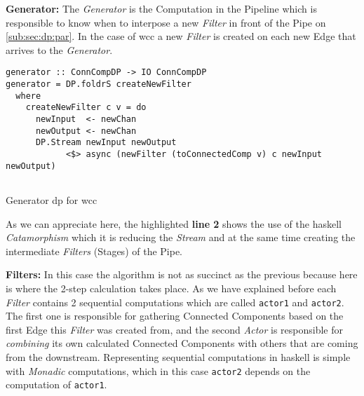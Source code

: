 \documentclass[preprint]{elsarticle}
\begin{document}
\textbf{Generator:}\newline
The \textit{Generator} is the Computation in the Pipeline which is responsible to know when to interpose a new \textit{Filter} in front of the Pipe on \autoref{sub:sec:dp:par}.
In the case of \acrshort{wcc} a new \textit{Filter} is created on each new Edge that arrives to the \textit{Generator}.

\begin{listing}[H]
\begin{verbatim}
generator :: ConnCompDP -> IO ConnCompDP
generator = DP.foldrS createNewFilter
  where
    createNewFilter c v = do
      newInput  <- newChan
      newOutput <- newChan
      DP.Stream newInput newOutput 
            <$> async (newFilter (toConnectedComp v) c newInput newOutput)
  
  \end{verbatim}
  \caption{Generator \acrshort{dp} for \acrshort{wcc}}
  \label{src:haskell:2}
\end{listing}

As we can appreciate here, the highlighted \textbf{line 2} shows the use of the \acrshort{haskell} \textit{Catamorphism} which it is reducing the \textit{Stream} and at the same time creating the intermediate \textit{Filters} (Stages) of the Pipe.

\textbf{Filters:}\newline
In this case the algorithm is not as succinct as the previous because here is where the 2-step calculation takes place. As we have explained before each \textit{Filter} contains 2 sequential computations which are called \texttt{actor1} and \texttt{actor2}. The first one is responsible for gathering Connected Components based on the first Edge this \textit{Filter} was created from, and the second \textit{Actor} is responsible for \textit{combining} its own calculated Connected Components with others that are coming from the downstream. Representing sequential computations in \acrshort{haskell} is simple with \emph{Monadic} computations, which in this case \texttt{actor2} depends on the computation of \texttt{actor1}.
\end{document}
